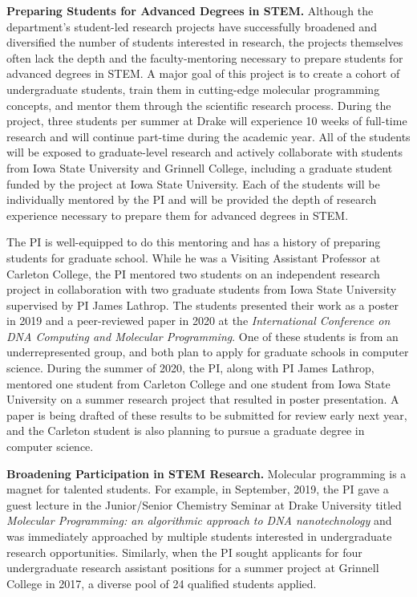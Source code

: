 \documentclass[11pt]{article}
\begin{document}
    \textbf{Preparing Students for Advanced Degrees in STEM.}
    Although the department's student-led research projects have successfully broadened and diversified the number of students interested in research, the projects themselves often lack the depth and the faculty-mentoring necessary to prepare students for advanced degrees in STEM.
    A major goal of this project is to create a cohort of undergraduate students, train them in cutting-edge molecular programming concepts, and mentor them through the scientific research process.
    During the project, three students per summer at Drake will experience 10 weeks of full-time research and will continue part-time during the academic year.
    All of the students will be exposed to graduate-level research and actively collaborate with students from Iowa State University and Grinnell College, including a graduate student funded by the project at Iowa State University.
    Each of the students will be individually mentored by the PI and will be provided the depth of research experience necessary to prepare them for advanced degrees in STEM.

    The PI is well-equipped to do this mentoring and has a history of preparing students for graduate school.
    While he was a Visiting Assistant Professor at Carleton College, the PI mentored two students on an independent research project in collaboration with two graduate students from Iowa State University supervised by PI James Lathrop.
    The students presented their work as a poster in 2019 and a peer-reviewed paper in 2020 at the \emph{International Conference on DNA Computing and Molecular Programming}.
    One of these students is from an underrepresented group, and both plan to apply for graduate schools in computer science.
    During the summer of 2020, the PI, along with PI James Lathrop, mentored one student from Carleton College and one student from Iowa State University on a summer research project that resulted in poster presentation.
    A paper is being drafted of these results to be submitted for review early next year, and the Carleton student is also planning to pursue a graduate degree in computer science.

    \textbf{Broadening Participation in STEM Research.}
    Molecular programming is a magnet for talented students.
    For example, in September, 2019, the PI gave a guest lecture in the Junior/Senior Chemistry Seminar at Drake University titled \emph{Molecular Programming: an algorithmic approach to DNA nanotechnology} and was immediately approached by multiple students interested in undergraduate research opportunities.
    Similarly, when the PI sought applicants for four undergraduate research assistant positions for a summer project at Grinnell College in 2017, a diverse pool of 24 qualified students applied.
\end{document}
